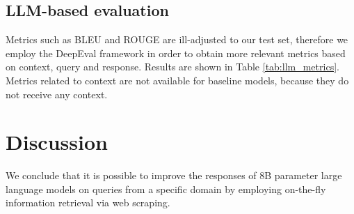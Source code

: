 \documentclass[fleqn,moreauthors,10pt]{ds_report}
\begin{document}
\subsection*{LLM-based evaluation}

Metrics such as BLEU and ROUGE are ill-adjusted to our test set, therefore we employ the DeepEval framework \cite{deepeval} in order to obtain more relevant metrics based on context, query and response. Results are shown in Table \ref{tab:llm_metrics}. Metrics related to context are not available for baseline models, because they do not receive any context. 

\begin{table*}[!htb]
{}
\caption{Performance comparison as evaluated by a 14B parameter Qwen model with GEval framework.}
\label{tab:llm_metrics}
\end{table*}



\section*{Discussion}

We conclude that it is possible to improve the responses of 8B parameter large language models on queries from a specific domain by employing on-the-fly information retrieval via web scraping.  





\end{document}
